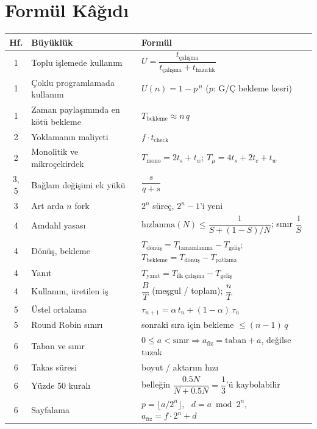 \section{Formül Kâğıdı}
\label{sec:sheet}
\begin{center}
\small
\renewcommand{\arraystretch}{1.55}
\begin{tabularx}{\linewidth}{@{}c >{\raggedright\arraybackslash}p{4.3cm} >{\raggedright\arraybackslash}X@{}}
\toprule
\textbf{Hf.} & \textbf{Büyüklük} & \textbf{Formül} \\
\midrule
1 & Toplu işlemede kullanım & $U = \dfrac{t_{\text{çalışma}}}{t_{\text{çalışma}} + t_{\text{hazırlık}}}$ \\
1 & Çoklu programlamada kullanım & $U(n) = 1 - p^{\,n}$ \quad ($p$: G/Ç bekleme kesri) \\
1 & Zaman paylaşımında en kötü bekleme & $T_{\text{bekleme}} \approx n\,q$ \\
2 & Yoklamanın maliyeti & $f \cdot t_{\text{check}}$ \\
2 & Monolitik ve mikroçekirdek & $T_{\text{mono}} = 2t_s + t_w$; \quad $T_{\mu} = 4t_s + 2t_c + t_w$ \\
3, 5 & Bağlam değişimi ek yükü & $\dfrac{s}{q+s}$ \\
3 & Art arda $n$ fork & $2^{n}$ süreç, $2^{n}-1$'i yeni \\
4 & Amdahl yasası & $\text{hızlanma}(N) \le \dfrac{1}{S + (1-S)/N}$; \quad sınır $\dfrac{1}{S}$ \\
4 & Dönüş, bekleme & $T_{\text{dönüş}} = T_{\text{tamamlanma}} - T_{\text{geliş}}$; \quad $T_{\text{bekleme}} = T_{\text{dönüş}} - T_{\text{patlama}}$ \\
4 & Yanıt & $T_{\text{yanıt}} = T_{\text{ilk çalışma}} - T_{\text{geliş}}$ \\
4 & Kullanım, üretilen iş & $\dfrac{B}{T}$ (meşgul / toplam); \quad $\dfrac{n}{T}$ \\
5 & Üstel ortalama & $\tau_{n+1} = \alpha\, t_n + (1-\alpha)\, \tau_n$ \\
5 & Round Robin sınırı & sonraki sıra için bekleme $\le (n-1)\,q$ \\
6 & Taban ve sınır & $0 \le a < \text{sınır} \Rightarrow a_{\text{fiz}} = \text{taban} + a$, değilse tuzak \\
6 & Takas süresi & boyut / aktarım hızı \\
6 & Yüzde 50 kuralı & belleğin $\dfrac{0.5N}{N + 0.5N} = \dfrac13$'ü kaybolabilir \\
6 & Sayfalama & $p = \lfloor a / 2^{n}\rfloor$, \ $d = a \bmod 2^{n}$, \ $a_{\text{fiz}} = f\cdot 2^{n} + d$ \\

\end{tabularx}
\end{center}
